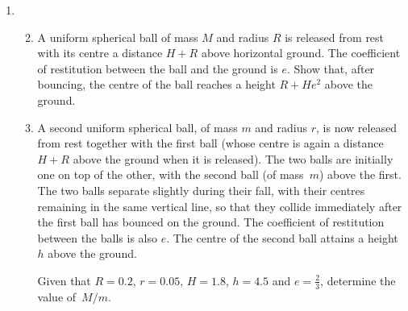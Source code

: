\documentclass[a4, 11pt]{report}
\newlength{\qspace}
\newcounter{qnumber}
\newenvironment{question}%
 {\vspace{\qspace}
  \begin{enumerate}[\bfseries 1\quad][10]%
    \setcounter{enumi}{\value{qnumber}}%
    \item%
 }
{
  \end{enumerate}
  \filbreak
  \stepcounter{qnumber}
 }
\newenvironment{questionparts}[1][1]%
 {
  \begin{enumerate}[\bfseries (i)]%
    \setcounter{enumii}{#1}
    \addtocounter{enumii}{-1}
    \setlength{\itemsep}{5mm}
    \setlength{\parskip}{8pt}
 }
 {
  \end{enumerate}
 }
\renewcommand{\.}[1]{\ensuremath{\mathrm{#1}}}
\newcommand{\+}[1]{\ensuremath{\mathbf{#1}}}
\begin{document}
\begin{question}	
  \begin{questionparts}
  \item A uniform spherical ball of mass $M$ and radius $R$ is
    released from rest with its centre a distance $H+R$ above
    horizontal ground.  The coefficient of restitution between the
    ball and the ground is $e$.  Show that, after bouncing, the centre
    of the ball reaches a height $R+He^2$ above the ground.
    
  \item A second uniform spherical ball, of mass $m$ and radius $r$,
    is now released from rest together with the first ball (whose
    centre is again a distance $H+R$ above the ground when it is
    released).  The two balls are initially one on top of the other, with
    the second ball (of mass~$m$) above the first.  The two balls
    separate slightly during their fall, with their centres remaining
    in the same vertical line, so that they collide immediately after the
    first ball has bounced on the ground. The coefficient of 
    restitution between the balls is also $e$.  The centre of the
    second ball attains a height $h$ above the ground.

    Given that $R=0.2$, $r=0.05$, $H=1.8$, $h=4.5$ and $e=\frac23$,
    determine the value of~$M/m$.
  \end{questionparts}
\end{question}

\end{document}
